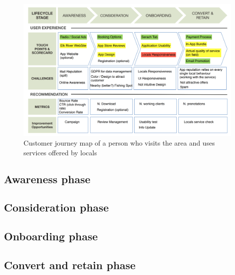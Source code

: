 \begin{figure}
\centering
\includegraphics[width=1.0\textwidth]{Img/Customer_journey_map}
\caption{Customer journey map of a person who visits the area and uses services offered by locals}
\end{figure}

\subsection{Awareness phase}
\subsection{Consideration phase}
\subsection{Onboarding phase}
\subsection{Convert and retain phase}